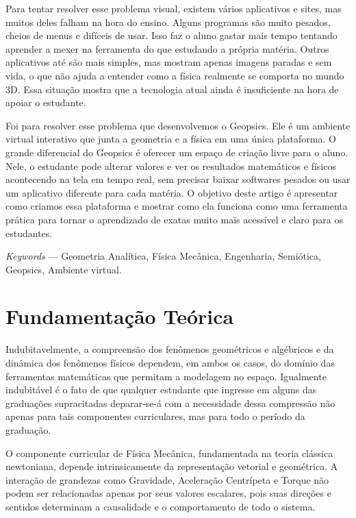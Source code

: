 \documentclass[conference,a4paper]{IEEEtran}
\begin{document}
Para tentar resolver esse problema visual, existem vários aplicativos e sites, mas muitos deles falham na hora do ensino. Alguns programas são muito pesados, cheios de menus e difíceis de usar. Isso faz o aluno gastar mais tempo tentando aprender a mexer na ferramenta do que estudando a própria matéria. Outros aplicativos até são mais simples, mas mostram apenas imagens paradas e sem vida, o que não ajuda a entender como a física realmente se comporta no mundo 3D. Essa situação mostra que a tecnologia atual ainda é insuficiente na hora de apoiar o estudante.

Foi para resolver esse problema que desenvolvemos o Geopsics. Ele é um ambiente virtual interativo que junta a geometria e a física em uma única plataforma. O grande diferencial do Geopsics é oferecer um espaço de criação livre para o aluno. Nele, o estudante pode alterar valores e ver os resultados matemáticos e físicos acontecendo na tela em tempo real, sem precisar baixar softwares pesados ou usar um aplicativo diferente para cada matéria. O objetivo deste artigo é apresentar como criamos essa plataforma e mostrar como ela funciona como uma ferramenta prática para tornar o aprendizado de exatas muito mais acessível e claro para os estudantes.

\textit{Keywords} --- Geometria Analítica, Física Mecânica, Engenharia, Semiótica, Geopsics, Ambiente virtual.

\section{Fundamentação Teórica}

Indubitavelmente, a compreensão dos fenômenos geométricos e algébricos e da dinâmica dos fenômenos físicos dependem, em ambos os casos, do domínio das ferramentas matemáticas que permitam a modelagem no espaço. Igualmente indubitável é o fato de que qualquer estudante que ingresse em alguns das graduações supracitadas deparar-se-á com a necessidade dessa compressão não apenas para tais componentes curriculares, mas para todo o período da graduação.

O componente curricular de Física Mecânica, fundamentada na teoria clássica newtoniana, depende intrinsicamente da representação vetorial e geométrica. A interação de grandezas como Gravidade, Aceleração Centrípeta e Torque não podem ser relacionadas apenas por seus valores escalares, pois suas direções e sentidos determinam a causalidade e o comportamento de todo o sistema.
\end{document}
